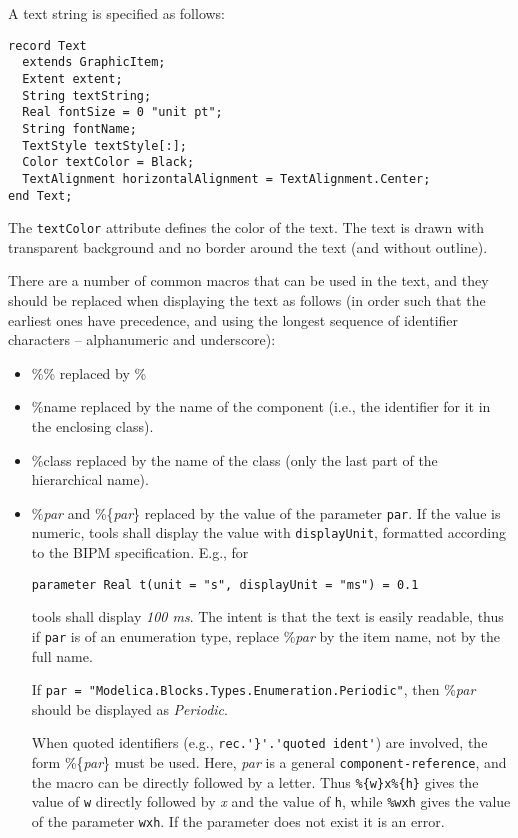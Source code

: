 A text string is specified as follows:
\begin{lstlisting}[language=modelica]
record Text
  extends GraphicItem;
  Extent extent;
  String textString;
  Real fontSize = 0 "unit pt";
  String fontName;
  TextStyle textStyle[:];
  Color textColor = Black;
  TextAlignment horizontalAlignment = TextAlignment.Center;
end Text;
\end{lstlisting}%
The \lstinline!textColor! attribute defines the color of the text.
The text is drawn with transparent background and no border around the text (and without outline).

There are a number of common macros that can be used in the text, and they should be replaced when displaying the text as follows (in order such that the earliest ones have precedence, and using the longest sequence of identifier characters -- alphanumeric and underscore):
\begin{itemize}
\item
  \%\% replaced by \%
\item
  \%name replaced by the name of the component (i.e., the identifier for it in the enclosing class).
\item
  \%class replaced by the name of the class (only the last part of the hierarchical name).
\item
  \%\emph{par} and \%\{\emph{par}\} replaced by the value of the parameter \lstinline!par!.
  If the value is numeric, tools shall display the value with \lstinline!displayUnit!, formatted according to the BIPM specification.
  E.g., for
\begin{lstlisting}[language=modelica]
parameter Real t(unit = "s", displayUnit = "ms") = 0.1
\end{lstlisting}
  tools shall display \emph{100 ms}.
  The intent is that the text is easily readable, thus if \lstinline!par! is of an enumeration type, replace \%\emph{par} by the item name, not by the full name.
  \begin{example}
  If \lstinline!par = "Modelica.Blocks.Types.Enumeration.Periodic"!, then \%\emph{par} should be displayed as \emph{Periodic}.
  \end{example}
  When quoted identifiers (e.g., \lstinline!rec.'}'.'quoted ident'!) are involved, the form \%\{\emph{par}\} must be used.
  Here, \emph{par} is a general \lstinline[language=grammar]!component-reference!, and the macro can be directly followed by a letter.
  Thus \lstinline!%{w}x%{h}! gives the value of \lstinline!w! directly followed by \emph{x} and the value of \lstinline!h!, while \lstinline!%wxh! gives the value of the parameter \lstinline!wxh!.
  If the parameter does not exist it is an error.
\end{itemize}

